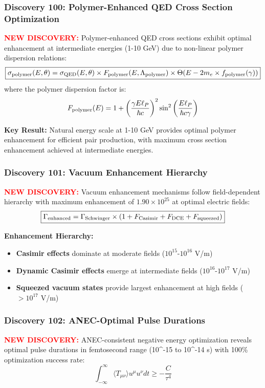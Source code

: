 \documentclass[11pt]{article}
\begin{document}
\subsubsection*{Discovery 100: Polymer-Enhanced QED Cross Section Optimization}
\textcolor{red}{\textbf{NEW DISCOVERY:}} Polymer-enhanced QED cross sections exhibit optimal enhancement at intermediate energies (1-10 GeV) due to non-linear polymer dispersion relations:
\[
  \boxed{\sigma_{\rm polymer}(E,\theta) = \sigma_{\rm QED}(E,\theta) \times F_{\rm polymer}(E,\Lambda_{\rm polymer}) \times \Theta(E - 2m_e \times f_{\rm polymer}(\gamma))}
\]
where the polymer dispersion factor is:
\begin{align*}
  F_{\rm polymer}(E) = 1 + \left(\frac{\gamma E \ell_P}{\hbar c}\right)^2 \sin^2\left(\frac{E \ell_P}{\hbar c \gamma}\right)
\end{align*}

\textbf{Key Result:} Natural energy scale at 1-10 GeV provides optimal polymer enhancement for efficient pair production, with maximum cross section enhancement achieved at intermediate energies.

\subsubsection*{Discovery 101: Vacuum Enhancement Hierarchy}
\textcolor{red}{\textbf{NEW DISCOVERY:}} Vacuum enhancement mechanisms follow field-dependent hierarchy with maximum enhancement of $1.90 \times 10^{25}$ at optimal electric fields:
\begin{align*}
  \boxed{\Gamma_{\rm enhanced} = \Gamma_{\rm Schwinger} \times (1 + F_{\rm Casimir} + F_{\rm DCE} + F_{\rm squeezed})}
\end{align*}

\textbf{Enhancement Hierarchy:}
\begin{itemize}
  \item \textbf{Casimir effects} dominate at moderate fields ($10^{15}$-$10^{16}$ V/m)
  \item \textbf{Dynamic Casimir effects} emerge at intermediate fields ($10^{16}$-$10^{17}$ V/m) 
  \item \textbf{Squeezed vacuum states} provide largest enhancement at high fields ($>10^{17}$ V/m)
\end{itemize}

\subsubsection*{Discovery 102: ANEC-Optimal Pulse Durations}
\textcolor{red}{\textbf{NEW DISCOVERY:}} ANEC-consistent negative energy optimization reveals optimal pulse durations in femtosecond range (10^{-15} to 10^{-14} s) with 100\% optimization success rate:
\[
  \boxed{\int_{-\infty}^{\infty} \langle T_{\mu\nu} \rangle u^\mu u^\nu dt \geq -\frac{C}{\tau^4}}
\]
\end{document}

